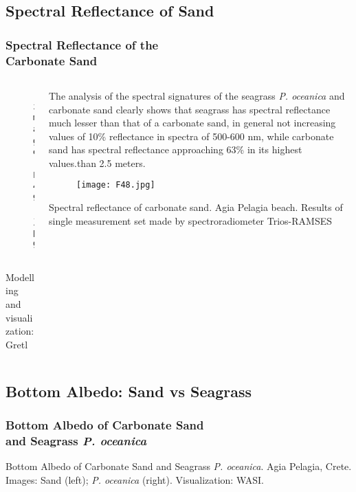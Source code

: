 \documentclass[pdflatex,compress,9pt,
	xcolor={dvipsnames,dvipsnames,svgnames,x11names,table},
	hyperref={colorlinks = true,breaklinks = true, urlcolor = NavyBlue, breaklinks = true}]{beamer}
\begin{document}
\subsection{Spectral Reflectance of Sand}
\begin{frame}\frametitle{Spectral Reflectance of the \\Carbonate Sand}
\begin{minipage}[0.4\textheight]{\textwidth}
\begin{columns}[T]
\begin{column}{0.6\textwidth}
\begin{figure}[H]
	\centering
		\texttt{[image: F49.jpg]}
\end{figure}
\scriptsize{Modelling and visualization: \ac{Gretl}}
\end{column}
\begin{column}{0.4\textwidth}
\small{The analysis of the spectral signatures of the seagrass \emph{P. oceanica} and carbonate sand clearly shows that seagrass has spectral reflectance much lesser than that of a carbonate sand, in general not increasing values of 10\% reflectance in spectra of 500-600 nm, while carbonate sand has spectral reflectance approaching 63\% in its highest values.than 2.5 meters.}
\begin{figure}[H]
	\centering
		\texttt{[image: F48.jpg]}
\end{figure}
\tiny{Spectral reflectance of carbonate sand. Agia Pelagia beach. Results of single measurement set made by spectroradiometer \ac{Trios-RAMSES}}
\end{column}
\end{columns}
\end{minipage}
\end{frame}

\subsection{Bottom Albedo: Sand vs Seagrass}
\begin{frame}\frametitle{Bottom Albedo of Carbonate Sand \\and Seagrass \emph{P. oceanica}}
Bottom Albedo of Carbonate Sand and Seagrass \emph{P. oceanica}. Agia Pelagia, Crete. Images: Sand (left); \emph{P. oceanica} (right). Visualization: \ac{WASI}.
\begin{figure}[H]
	\centering
			\hspace{5mm}
\end{figure}
\end{frame}
\end{document}
